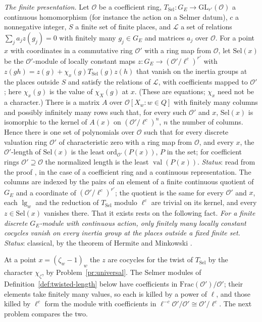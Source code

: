 \documentclass[reqno]{amsart}
\theoremstyle{definition}
\theoremstyle{plain}
\newcommand{\Sel}{\mathrm{Sel}}
\newcommand{\val}{\operatorname{val}}
\newcommand{\ord}{\mathrm{ord}}
\newcommand{\Oc}{\mathcal{O}}
\newcommand{\TS}{T_{\mathrm{Sel}}}
\begin{document}
\emph{The finite presentation.}  Let \(\Oc\) be a coefficient ring, \(\TS \colon G_E \to \mathrm{GL}_{r'}(\Oc)\) a continuous homomorphism (for instance the action on a Selmer datum), \(c\) a nonnegative integer, \(S\) a finite set of finite places, and \(\mathcal L\) a set of relations \(\sum_j a_j z(g_j) = 0\) with finitely many \(g_j \in G_E\) and matrices \(a_j\) over \(\Oc\).  For a point \(x\) with coordinates in a commutative ring \(\Oc'\) with a ring map from \(\Oc\), let \(\Sel(x)\) be the \(\Oc'\)-module of locally constant maps \(z \colon G_E \to (\Oc'/\ell^{c})^{r'}\) with \(z(gh) = z(g) + \chi_x(g)\TS(g)z(h)\) that vanish on the inertia groups at the places outside \(S\) and satisfy the relations of \(\mathcal L\), with coefficients mapped to \(\Oc'\); here \(\chi_x(g)\) is the value of \(\chi_X(g)\) at \(x\).  (These are equations; \(\chi_x\) need not be a character.)  There is a matrix \(A\) over \(\Oc[X_w : w \in Q]\) with finitely many columns and possibly infinitely many rows such that, for every such \(\Oc'\) and \(x\), \(\Sel(x)\) is isomorphic to the kernel of \(A(x)\) on \((\Oc'/\ell^{c})^{n}\), \(n\) the number of columns.  Hence there is one set of polynomials over \(\Oc\) such that for every discrete valuation ring \(\Oc'\) of characteristic zero with a ring map from \(\Oc\), and every \(x\), the \(\Oc'\)-length of \(\Sel(x)\) is the least \(\ord_{\Oc'}(P(x))\), \(P\) in the set; for coefficient rings \(\Oc' \supseteq \Oc\) the normalized length is the least \(\val(P(x))\).  \emph{Status}: read from the proof \cite{GL}, in the case of a coefficient ring and a continuous representation.  The columns are indexed by the pairs of an element of a finite continuous quotient of \(G_E\) and a coordinate of \((\Oc'/\ell^c)^{r'}\); the quotient is the same for every \(\Oc'\) and \(x\), each \(\lg_w\) and the reduction of \(\TS\) modulo \(\ell^c\) are trivial on its kernel, and every \(z \in \Sel(x)\) vanishes there.  That it exists rests on the following fact.  \emph{For a finite discrete \(G_E\)-module with continuous action, only finitely many locally constant cocycles vanish on every inertia group at the places outside a fixed finite set.}  \emph{Status}: classical, by the theorem of Hermite and Minkowski \cite[Ch.~III, \S2]{Ne}.

At a point \(x = (\zeta_w - 1)_w\) the \(z\) are cocycles for the twist of \(\TS\) by the character \(\chi_\zeta\), by Problem~\ref{pr:universal}.  The Selmer modules of Definition~\ref{def:twisted-length} below have coefficients in \(\mathrm{Frac}(\Oc')/\Oc'\); their elements take finitely many values, so each is killed by a power of \(\ell\), and those killed by \(\ell^{c}\) form the module with coefficients in \(\ell^{-c}\Oc'/\Oc' \cong \Oc'/\ell^{c}\).  The next problem compares the two.
\end{document}
